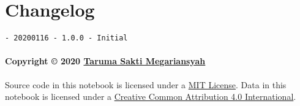 \documentclass[11pt]{article}
\begin{document}
    \hypertarget{changelog}{%
\section{Changelog}\label{changelog}}

\begin{verbatim}
- 20200116 - 1.0.0 - Initial
\end{verbatim}

\hypertarget{copyright-2020-taruma-sakti-megariansyah}{%
\paragraph{\texorpdfstring{Copyright © 2020
\href{https://taruma.github.io}{Taruma Sakti
Megariansyah}}{Copyright © 2020 Taruma Sakti Megariansyah}}\label{copyright-2020-taruma-sakti-megariansyah}}

Source code in this notebook is licensed under a
\href{https://choosealicense.com/licenses/mit/}{MIT License}. Data in
this notebook is licensed under a
\href{https://creativecommons.org/licenses/by/4.0/}{Creative Common
Attribution 4.0 International}.


    
    
    
\end{document}

